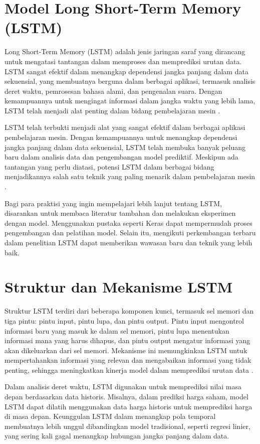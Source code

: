 \section{Model Long Short-Term Memory (LSTM)}
\par Long Short-Term Memory (LSTM) adalah jenis jaringan saraf yang dirancang untuk mengatasi tantangan dalam memproses dan memprediksi urutan data. LSTM sangat efektif dalam menangkap dependensi jangka panjang dalam data sekuensial, yang membuatnya berguna dalam berbagai aplikasi, termasuk analisis deret waktu, pemrosesan bahasa alami, dan pengenalan suara. Dengan kemampuannya untuk mengingat informasi dalam jangka waktu yang lebih lama, LSTM telah menjadi alat penting dalam bidang pembelajaran mesin \citep{hochreiter1997}.
\par LSTM telah terbukti menjadi alat yang sangat efektif dalam berbagai aplikasi pembelajaran mesin. Dengan kemampuannya untuk menangkap dependensi jangka panjang dalam data sekuensial, LSTM telah membuka banyak peluang baru dalam analisis data dan pengembangan model prediktif. Meskipun ada tantangan yang perlu diatasi, potensi LSTM dalam berbagai bidang menjadikannya salah satu teknik yang paling menarik dalam pembelajaran mesin \citep{graves2013}.

\par Bagi para praktisi yang ingin mempelajari lebih lanjut tentang LSTM, disarankan untuk membaca literatur tambahan dan melakukan eksperimen dengan model. Menggunakan pustaka seperti Keras dapat mempermudah proses pengembangan dan pelatihan model. Selain itu, mengikuti perkembangan terbaru dalam penelitian LSTM dapat memberikan wawasan baru dan teknik yang lebih baik.

\section{Struktur dan Mekanisme LSTM}
\par Struktur LSTM terdiri dari beberapa komponen kunci, termasuk sel memori dan tiga pintu: pintu input, pintu lupa, dan pintu output. Pintu input mengontrol informasi baru yang masuk ke dalam sel memori, pintu lupa menentukan informasi mana yang harus dihapus, dan pintu output mengatur informasi yang akan dikeluarkan dari sel memori. Mekanisme ini memungkinkan LSTM untuk mempertahankan informasi yang relevan dan mengabaikan informasi yang tidak penting, sehingga meningkatkan kinerja model dalam memprediksi urutan data \citep{graves2013}.

\par Dalam analisis deret waktu, LSTM digunakan untuk memprediksi nilai masa depan berdasarkan data historis. Misalnya, dalam prediksi harga saham, model LSTM dapat dilatih menggunakan data harga historis untuk memprediksi harga di masa depan. Keunggulan LSTM dalam menangkap pola temporal membuatnya lebih unggul dibandingkan model tradisional, seperti regresi linier, yang sering kali gagal menangkap hubungan jangka panjang dalam data.

